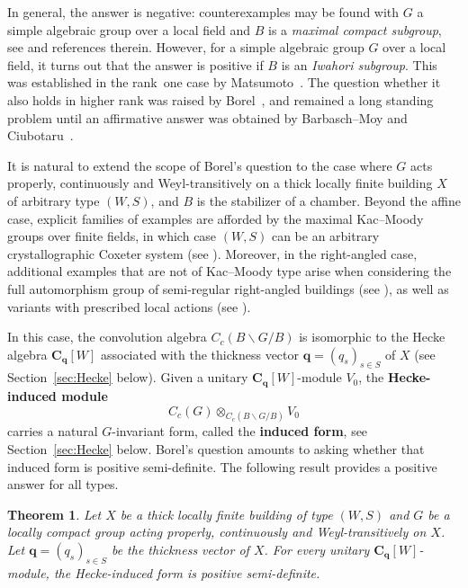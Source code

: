 \documentclass[12pt,a4paper]{amsproc}
\newtheorem{thmintro}{Theorem}
\theoremstyle{definition}
\newcommand{\CC}{\mathbf C}
\begin{document}
In general, the answer is negative:  counterexamples may be found with $G$  a simple algebraic group over a local field and $B$ is a \textit{maximal compact subgroup}, see \cite{LarsenPalma} and references therein. However, for a simple algebraic group $G$ over a local field, it turns out that the answer is positive if $B$ is an \textit{Iwahori subgroup}. This was established in the rank~one case by Matsumoto~\cite[\S 5.6.6, p.~215]{Matsumoto}. The question whether it also holds in higher rank was raised by Borel~\cite[\S 5.11]{Borel}, and remained a long standing problem until an affirmative answer was obtained by Barbasch--Moy and Ciubotaru~\cite{BM89, BM93, Ciubotaru}. 
 
It is natural to extend the scope of Borel's question to the case where $G$ acts properly, continuously and Weyl-transitively on a thick locally finite building $X$ of arbitrary type $(W, S)$, and $B$ is the stabilizer of a chamber. Beyond the affine case, explicit families of examples  are afforded by the maximal Kac--Moody groups over finite fields, in which case $(W, S)$ can be an arbitrary crystallographic Coxeter system  (see \cite[Ch.~8]{Marquis_book}). Moreover, in the right-angled case, additional examples that are not of Kac--Moody type arise when considering  the full automorphism group of semi-regular right-angled buildings (see \cite{CapRAB}), as well as variants with prescribed local actions (see \cite{DMSS}).  

In this case, the convolution algebra  $C_c(B\backslash G/B)$ is isomorphic to the Hecke algebra $\CC_{\mathbf q}[W]$   associated with the thickness vector $\mathbf q = (q_s)_{s \in S}$  of $X$ (see Section~\ref{sec:Hecke} below). Given a unitary $\CC_{\mathbf q}[W]$-module $V_0$, the \textbf{Hecke-induced module} 
$$C_c(G) \otimes_{C_c(B\backslash G/B)} V_0$$ 
carries a natural $G$-invariant form, called the \textbf{induced form}, see Section~\ref{sec:Hecke} below. Borel's question amounts to asking whether that induced form is positive semi-definite. The following result provides a positive answer for all types. 

\begin{thmintro}\label{thmintro:unitary}
Let $X$ be a thick locally finite building of type $(W, S)$ and $G$ be a locally compact group acting properly, continuously and Weyl-transitively on $X$. Let  $\mathbf q = (q_s)_{s\in S}$ be the thickness vector of $X$. For every unitary $\CC_{\mathbf q}[W]$-module,  the Hecke-induced form is positive semi-definite. 
\end{thmintro}
\end{document}
